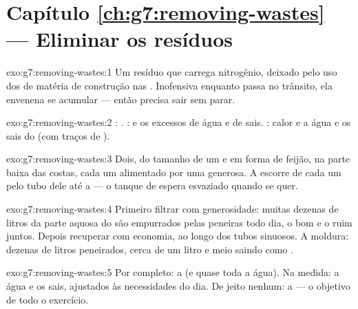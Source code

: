 \section*{Capítulo \ref{ch:g7:removing-wastes} --- Eliminar os resíduos}

\begin{solution}{exo:g7:removing-wastes:1}
Um resíduo que carrega nitrogênio, deixado pelo uso dos  de
matéria de construção nas . Inofensiva enquanto passa no
trânsito, ela envenena se acumular --- então precisa sair sem parar.
\end{solution}

\begin{solution}{exo:g7:removing-wastes:2}
: . :  e os excessos de água e de sais.
: calor e a água e os sais do  (com traços de ).
\end{solution}

\begin{solution}{exo:g7:removing-wastes:3}
Dois, do tamanho de um  e em forma de feijão, na parte baixa das
costas, cada um alimentado por uma  generosa. A  escorre de
cada um pelo tubo dele até a  --- o tanque de espera esvaziado
quando se quer.
\end{solution}

\begin{solution}{exo:g7:removing-wastes:4}
Primeiro filtrar com generosidade: muitas dezenas de litros da parte
aquosa do  são empurrados pelas peneiras todo dia, o bom e o
ruim juntos. Depois recuperar com economia, ao longo dos tubos
sinuosos. A moldura: dezenas de litros peneirados, cerca de um litro e
meio saindo como .
\end{solution}

\begin{solution}{exo:g7:removing-wastes:5}
Por completo: a  (e quase toda a água). Na medida: a água e os
sais, ajustados às necessidades do dia. De jeito nenhum: a  --- o
objetivo de todo o exercício.
\end{solution}

